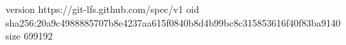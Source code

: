 version https://git-lfs.github.com/spec/v1
oid sha256:20a9c4988885707b8e4237aa615f0840b8d4b99bc8c315853616f40f83ba9140
size 699192
